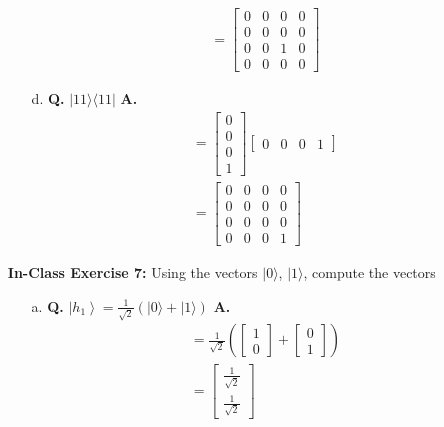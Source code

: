\documentclass[main.tex]{subfiles}
\begin{document}
\begin{enumerate}
\begin{enumerate}
\begin{align*}
            & = \left[\begin{array}{llll} 0 & 0 & 0 & 0 \\ 0 & 0 & 0 & 0 \\ 0 & 0 & 1 & 0 \\ 0 & 0 & 0 & 0 \end{array}\right] 
        \end{align*}
        \item[d.] \textbf{Q.} $|11\rangle\langle 11|$ \textbf{A.}
        \begin{align*}
            & = \left[\begin{array}{l} 0 \\ 0 \\ 0 \\ 1 \end{array}\right] \left[\begin{array}{llll} 0 & 0 & 0 & 1 \end{array}\right] \\
            & = \left[\begin{array}{llll} 0 & 0 & 0 & 0 \\ 0 & 0 & 0 & 0 \\ 0 & 0 & 0 & 0 \\ 0 & 0 & 0 & 1 \end{array}\right] 
        \end{align*}
    \end{enumerate}

\item[] \textbf{In-Class Exercise 7:} Using the vectors $|0\rangle$, $|1\rangle$, compute the vectors

    \begin{enumerate}
        \item[a.] \textbf{Q.} $\left|h_{1}\right\rangle=\frac{1}{\sqrt{2}}(|0\rangle+|1\rangle)$ \textbf{A.}
        \begin{align*}
            & = \frac{1}{\sqrt{2}} \left( \left[\begin{array}{l} 1 \\ 0 \end{array}\right] + \left[\begin{array}{l} 0 \\ 1 \end{array}\right] \right)\\
            & = \left[\begin{array}{l} \frac{1}{\sqrt{2}} \\ \frac{1}{\sqrt{2}} \end{array}\right] 
        \end{align*}
        

\end{enumerate}
\end{enumerate}
\end{document}
